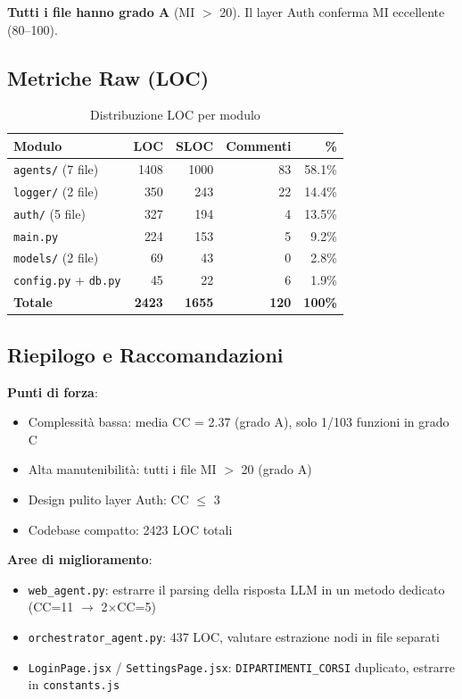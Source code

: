 \documentclass[a4paper,12pt]{report}
\begin{document}
\textbf{Tutti i file hanno grado A} (MI $>$ 20). Il layer Auth conferma MI eccellente (80--100).

\subsection{Metriche Raw (LOC)}

\begin{table}[H]
\centering
\begin{tabularx}{\textwidth}{l r r r r}
\toprule
\textbf{Modulo} & \textbf{LOC} & \textbf{SLOC} & \textbf{Commenti} & \textbf{\%} \\
\midrule
\texttt{agents/} (7 file) & 1408 & 1000 & 83 & 58.1\% \\
\texttt{logger/} (2 file) & 350 & 243 & 22 & 14.4\% \\
\texttt{auth/} (5 file) & 327 & 194 & 4 & 13.5\% \\
\texttt{main.py} & 224 & 153 & 5 & 9.2\% \\
\texttt{models/} (2 file) & 69 & 43 & 0 & 2.8\% \\
\texttt{config.py} + \texttt{db.py} & 45 & 22 & 6 & 1.9\% \\
\midrule
\textbf{Totale} & \textbf{2423} & \textbf{1655} & \textbf{120} & \textbf{100\%} \\
\bottomrule
\end{tabularx}
\caption{Distribuzione LOC per modulo}
\end{table}

\subsection{Riepilogo e Raccomandazioni}

\textbf{Punti di forza}:
\begin{itemize}
    \item Complessità bassa: media CC = 2.37 (grado A), solo 1/103 funzioni in grado C
    \item Alta manutenibilità: tutti i file MI $>$ 20 (grado A)
    \item Design pulito layer Auth: CC $\leq$ 3
    \item Codebase compatto: 2423 LOC totali
\end{itemize}

\textbf{Aree di miglioramento}:
\begin{itemize}
    \item \texttt{web\_agent.py}: estrarre il parsing della risposta LLM in un metodo dedicato (CC=11 $\rightarrow$ 2$\times$CC=5)
    \item \texttt{orchestrator\_agent.py}: 437 LOC, valutare estrazione nodi in file separati
    \item \texttt{LoginPage.jsx} / \texttt{SettingsPage.jsx}: \texttt{DIPARTIMENTI\_CORSI} duplicato, estrarre in \texttt{constants.js}
\end{itemize}
\end{document}
